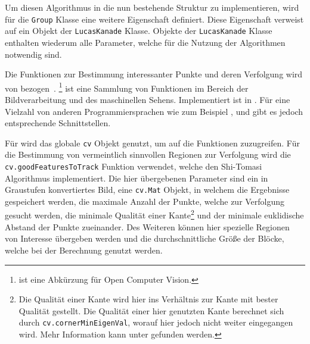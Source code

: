 Um diesen Algorithmus in die nun bestehende Struktur zu implementieren, wird für die \lstinline{Group} Klasse eine weitere Eigenschaft definiert.
Diese Eigenschaft verweist auf ein Objekt der \lstinline{LucasKanade} Klasse.
Objekte der \lstinline{LucasKanade} Klasse enthalten wiederum alle Parameter, welche für die Nutzung der Algorithmen notwendig sind.

Die Funktionen zur Bestimmung interessanter Punkte und deren Verfolgung wird von  bezogen~\cite{OpenCV2021}.
\footnote{ ist eine Abkürzung für Open Computer Vision.} ist eine Sammlung von Funktionen im Bereich der Bildverarbeitung und des maschinellen Sehens.
Implementiert ist  in .
Für eine Vielzahl von anderen Programmiersprachen wie zum Beispiel ,  und  gibt es jedoch entsprechende Schnittstellen.

Für  wird das globale \lstinline{cv} Objekt genutzt, um auf die Funktionen zuzugreifen.
Für die Bestimmung von vermeintlich sinnvollen Regionen zur Verfolgung wird die \lstinline{cv.goodFeaturesToTrack} Funktion verwendet, welche den Shi-Tomasi Algorithmus implementiert.
Die hier übergebenen Parameter sind ein in Graustufen konvertiertes Bild, eine \lstinline{cv.Mat} Objekt, in welchem die Ergebnisse gespeichert werden, die maximale Anzahl der Punkte, welche zur Verfolgung gesucht werden, die minimale Qualität einer Kante\footnote{Die Qualität einer Kante wird hier ins Verhältnis zur Kante mit bester Qualität gestellt.
Die Qualität einer hier genutzten Kante berechnet sich durch \lstinline{cv.cornerMinEigenVal}, worauf hier jedoch nicht weiter eingegangen wird.
Mehr Information kann unter  gefunden werden.} und der minimale euklidische Abstand der Punkte zueinander.
Des Weiteren können hier spezielle Regionen von Interesse übergeben werden und die durchschnittliche Grö{\ss}e der Blöcke, welche bei der Berechnung genutzt werden.

